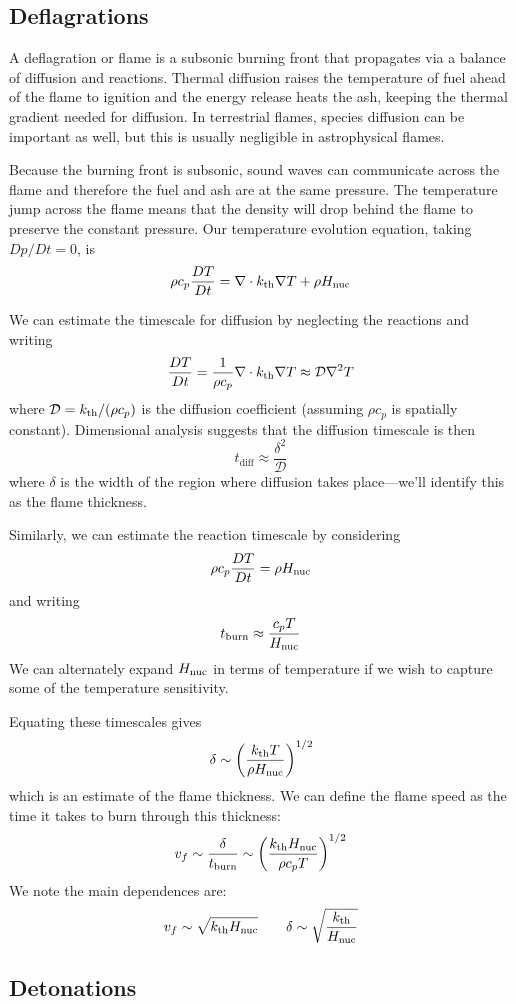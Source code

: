 \subsection{Deflagrations}

A deflagration or flame is a subsonic burning front that propagates
via a balance of diffusion and reactions.  Thermal diffusion raises
the temperature of fuel ahead of the flame to ignition and the energy
release heats the ash, keeping the thermal gradient needed for
diffusion.  In terrestrial flames, species diffusion can be important
as well, but this is usually negligible in astrophysical flames.

Because the burning front is subsonic, sound waves can communicate
across the flame and therefore the fuel and ash are at the same
pressure.  The temperature jump across the flame means that the
density will drop behind the flame to preserve the constant pressure.
Our temperature evolution equation, taking $Dp/Dt = 0$, is
\begin{equation}
\rho c_p {\frac{{DT}}{D t}} = \nabla \cdot {k_\mathrm{th}} \nabla T + \rho {H_\mathrm{nuc}}
\end{equation}

We can estimate the timescale for diffusion by neglecting the reactions
and writing
\begin{equation}
{\frac{{DT}}{D t}} = \frac{1}{\rho c_p} \nabla \cdot {k_\mathrm{th}} \nabla T \approx \mathcal{D} \nabla^2 T
\end{equation}
where $\mathcal{D} = {k_\mathrm{th}}/(\rho c_p)$ is the diffusion coefficient
(assuming $\rho c_p$ is spatially constant). Dimensional analysis suggests that the 
diffusion timescale is then
\begin{equation}
t_\mathrm{diff} \approx \frac{\delta^2}{\mathcal{D}}
\end{equation}
where $\delta$ is the width of the region where diffusion takes
place---we'll identify this as the flame thickness.

Similarly, we can estimate the reaction timescale by considering
\begin{equation}
\rho c_p {\frac{{DT}}{D t}} = \rho {H_\mathrm{nuc}}
\end{equation}
and writing
\begin{equation}
t_\mathrm{burn} \approx \frac{c_p T}{{H_\mathrm{nuc}}}
\end{equation}
We can alternately expand ${H_\mathrm{nuc}}$ in terms of temperature
if we wish to capture some of the temperature sensitivity.

Equating these timescales gives
\begin{equation}
\delta \sim \left ( \frac{{k_\mathrm{th}} T}{\rho {H_\mathrm{nuc}}} \right )^{1/2}
\end{equation}
which is an estimate of the flame thickness.  We can define the flame
speed as the time it takes to burn through this thickness:
\begin{equation}
v_f \sim \frac{\delta}{t_\mathrm{burn}} \sim \left ( \frac{{k_\mathrm{th}} {H_\mathrm{nuc}}}{\rho c_p T} \right )^{1/2}
\end{equation}
We note the main dependences are:
\begin{equation}
v_f \sim \sqrt{{k_\mathrm{th}} {H_\mathrm{nuc}}} \qquad \delta \sim \sqrt{\frac{{k_\mathrm{th}}}{{H_\mathrm{nuc}}}}
\end{equation}

\subsection{Detonations}

